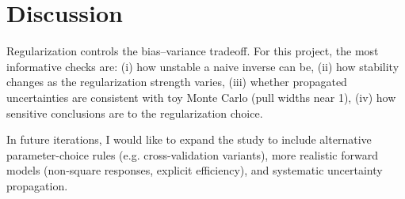 \documentclass[11pt,a4paper]{article}
\begin{document}
\section{Discussion}
Regularization controls the bias--variance tradeoff.
For this project, the most informative checks are:
(i) how unstable a naive inverse can be,
(ii) how stability changes as the regularization strength varies,
(iii) whether propagated uncertainties are consistent with toy Monte Carlo (pull widths near 1),
(iv) how sensitive conclusions are to the regularization choice.

In future iterations, I would like to expand the study to include alternative parameter-choice rules (e.g. cross-validation variants),
more realistic forward models (non-square responses, explicit efficiency), and systematic uncertainty propagation.
\end{document}

